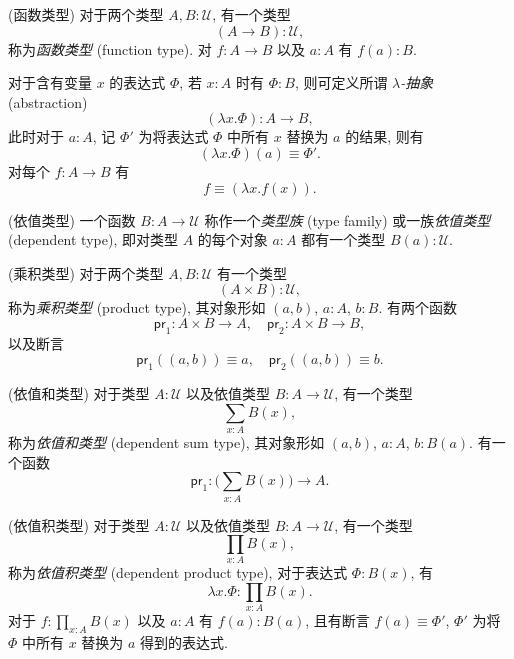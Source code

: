 \begin{axiom}
	{(函数类型)}
	对于两个类型 $A,B : \mathcal U$, 有一个类型 $$(A\to B) : \mathcal U,$$
	称为\emph{函数类型} (function type).
	对 $f\colon A\to B$ 以及 $a : A$ 有 $f(a) : B$.
	
	对于含有变量 $x$ 的表达式 $\Phi$, 若 $x : A$ 时有 $\Phi : B$,
	则可定义所谓 \emph{$\lambda$-抽象} (abstraction)
	\[
	(\lambda x.\Phi) : A \to B,
	\]
	此时对于 $a : A$, 记 $\Phi'$ 为将表达式 $\Phi$ 中所有 $x$ 替换为 $a$ 的结果,
	则有
	$$(\lambda x.\Phi)(a) \equiv \Phi'.$$
	对每个 $f \colon A\to B$ 有
	$$
	f \equiv (\lambda x.f(x)).
	$$
\end{axiom}

\begin{example}
	{(依值类型)}
	一个函数 $B\colon A \to \mathcal U$ 称作一个\emph{类型族} (type family) 或一族\emph{依值类型} (dependent type),
	即对类型 $A$ 的每个对象 $a : A$ 都有一个类型 $B(a) : \mathcal U$.
\end{example}

\newcommand{\pr}{\mathsf{pr}}

\begin{axiom}
	{(乘积类型)}
	对于两个类型 $A,B : \mathcal U$ 有一个类型 $$(A\times B) : \mathcal U,$$
	称为\emph{乘积类型} (product type),
	其对象形如 $(a,b)$, $a:A$, $b:B$.
	有两个函数 $$\pr_1\colon A\times B\to A,\quad
	\pr_2\colon A\times B\to B,$$
	以及断言
	\[
	\pr_1((a,b)) \equiv a,\quad
	\pr_2((a,b)) \equiv b.
	\]
\end{axiom}

\begin{axiom}
	{(依值和类型)}
	对于类型 $A : \mathcal U$ 以及依值类型 $B : A \to \mathcal U$,
	有一个类型
	\[
	\sum_{x : A} B(x),
	\]
	称为\emph{依值和类型} (dependent sum type),
	其对象形如 $(a,b)$, $a:A$, $b:B(a)$.
	有一个函数 $$\pr_1\colon \Big(\sum_{x : A} B(x)\Big) \to A.$$
\end{axiom}

\begin{axiom}
	{(依值积类型)}
	对于类型 $A : \mathcal U$ 以及依值类型 $B : A \to \mathcal U$,
	有一个类型
	\[
	\prod_{x : A} B(x),
	\]
	称为\emph{依值积类型} (dependent product type),
	对于表达式 $\Phi : B(x)$,
	有 $$\lambda x.\Phi : \prod_{x:A} B(x).$$
	对于 $f:\prod_{x:A} B(x)$ 以及 $a:A$ 有 $f(a) : B(a)$, 且有断言
	$f(a) \equiv \Phi'$, $\Phi'$ 为将 $\Phi$ 中所有 $x$ 替换为 $a$ 得到的表达式.
\end{axiom}



